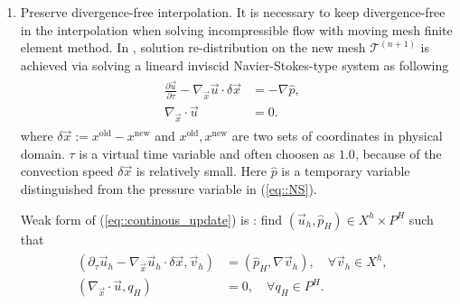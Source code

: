 \documentclass{eajam}
\begin{document}
\begin{enumerate}[step 1]
     \item Preserve divergence-free interpolation.
       It is necessary to keep divergence-free in the interpolation
       when solving incompressible flow with moving mesh finite element
       method. In \cite{di2005moving}, solution re-distribution on the new 
       mesh $\mathcal{T}^{(n + 1)}$ is achieved via solving a lineard inviscid 
       Navier-Stokes-type system as following
       \begin{eqnarray}
         \begin{aligned}
           \frac{\partial \vec{u}}{\partial \tau} - \nabla_{\vec{x}}\vec{u}
           \cdot \delta \vec{x} & =  - \nabla \hat{p},& \\
           \nabla_{\vec{x}}\cdot \vec{u} & =  0.&
         \end{aligned}
         \label{eq::continous_update}
       \end{eqnarray} 
       where $\delta \vec{x} := x^{\text{old}} - x^{\text{new}}$ and 
       $x^{\text{old}}, x^{\text{new}}$ are two sets of coordinates in
       physical domain. $\tau$ is a virtual time variable and often
       choosen as $1.0$, because of the convection speed $\delta \vec{x}$
       is relatively small. Here $\hat{p}$ is a temporary variable
       distinguished from the pressure variable in (\ref{eq::NS}). 

       Weak form of (\ref{eq::continous_update}) is : find
       $(\vec{u}_h, \hat{p}_H) \in X^h \times P^H$ such that 
       \begin{eqnarray}
         \begin{aligned}
           \left( \partial_{\tau} \vec{u}_h - \nabla_{\vec{x}}\vec{u}_h
           \cdot \delta \vec{x}, \vec{v}_h \right) & =  \left( \hat{p}_H, \nabla
           \vec{v}_h \right), \quad \forall \vec{v}_h \in X^h, & \\
           \left( \nabla_{\vec{x}} \cdot \vec{u}, q_H\right) & = 0, \quad \forall
           q_H \in P^H. &
         \end{aligned}
         \label{eq::semi_discreted_update}
       \end{eqnarray}
       

\end{enumerate}
\end{document}

